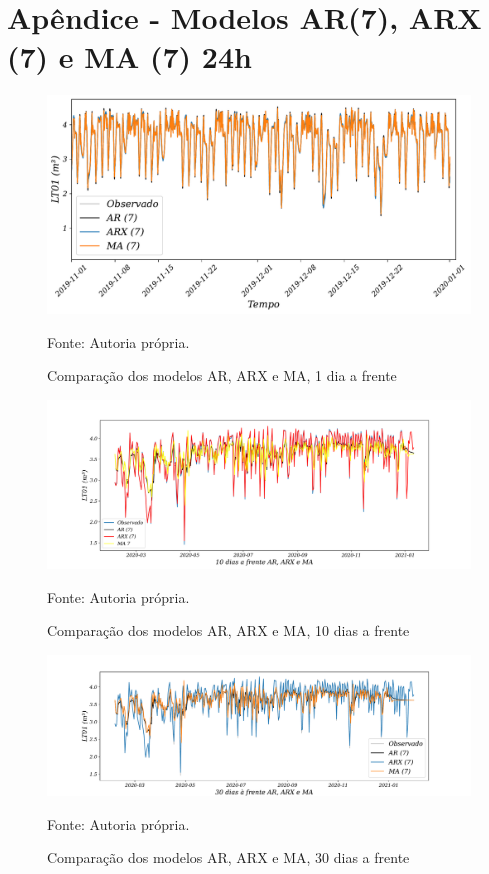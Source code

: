 
\section{Ap\^endice - Modelos AR(7), ARX (7) e MA (7) 24h }\label{sec:ararxma24}

\begin{figure}[H]
	\centering
	\caption{Comparação dos modelos AR, ARX e MA, 1 dia a frente }
	\label{fig:1-AR-ARX-MA24}
	\includegraphics[width=1\linewidth]{Apendices/Figuras/modelagem-24h/1-AR-ARX-MA}
	
	Fonte: Autoria própria.
\end{figure}

\begin{figure}[H]
	\centering
	\caption{Comparação dos modelos AR, ARX e MA, 10 dias a frente }
	\label{fig:10-AR-ARX-MA24}
	\includegraphics[width=1\linewidth]{Apendices/Figuras/modelagem-24h/10-AR-ARX-MA}
	
	Fonte: Autoria própria.
\end{figure}


\begin{figure}[H]
	\centering
	\caption{Comparação dos modelos AR, ARX e MA, 30 dias a frente }
	\label{fig:30-AR-ARX-MA24}
	\includegraphics[width=1\linewidth]{Apendices/Figuras/modelagem-24h/30-AR-ARX-MA}
	
	Fonte: Autoria própria.
\end{figure}


